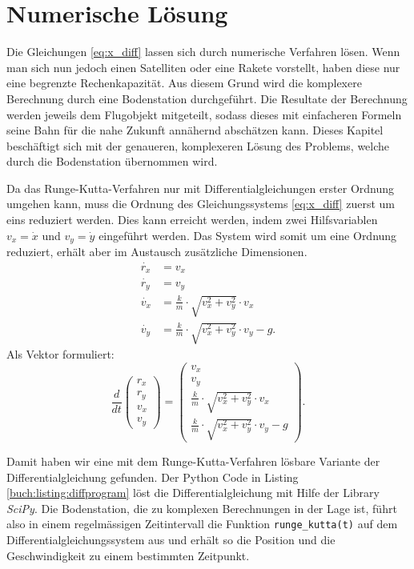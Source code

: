 \section{Numerische Lösung
\label{perturbation:section:nummerischeloesung}}
Die Gleichungen \eqref{eq:x_diff} lassen sich durch numerische Verfahren lösen.
Wenn man sich nun jedoch einen Satelliten oder eine Rakete vorstellt, haben diese nur eine begrenzte Rechenkapazität.
Aus diesem Grund wird die komplexere Berechnung durch eine Bodenstation durchgeführt.
Die Resultate der Berechnung werden jeweils dem Flugobjekt mitgeteilt, sodass dieses mit einfacheren Formeln seine Bahn für die nahe Zukunft annähernd abschätzen kann.
Dieses Kapitel beschäftigt sich mit der genaueren, komplexeren Lösung des Problems, welche durch die Bodenstation übernommen wird.

Da das Runge-Kutta-Verfahren nur mit Differentialgleichungen erster Ordnung umgehen kann, muss die Ordnung des Gleichungssystems \eqref{eq:x_diff}  zuerst um eins reduziert werden.
Dies kann erreicht werden, indem zwei Hilfsvariablen $v_x = \dot{x}$ und $v_y = \dot{y}$ eingeführt werden.
Das System wird somit um eine Ordnung reduziert, erhält aber im Austausch zusätzliche Dimensionen.
\begin{equation*}
\begin{aligned}
	\dot{r_x} &= v_x  \\
	\dot{r_y} &= v_y \\
	\dot{v_x} &= \frac{k}{m} \cdot \sqrt{v_x^2 + v_y^2} \cdot v_x \\
	\dot{v_y} &= \frac{k}{m} \cdot \sqrt{v_x^2 + v_y^2} \cdot v_y - g.
\end{aligned}
\end{equation*}
Als Vektor formuliert:
\[
\frac{d}{dt}\begin{pmatrix}r_x\\r_y\\v_x\\v_y\end{pmatrix} = \begin{pmatrix}v_x\\v_y\\\frac{k}{m} \cdot \sqrt{v_x^2 + v_y^2} \cdot v_x\\\frac{k}{m} \cdot \sqrt{v_x^2 + v_y^2} \cdot v_y - g\end{pmatrix}.
\]

Damit haben wir eine mit dem  Runge-Kutta-Verfahren lösbare Variante der Differentialgleichung gefunden.
Der Python Code in Listing \ref{buch:listing:diffprogram} löst die Differentialgleichung mit Hilfe der Library \textit{SciPy}.
Die Bodenstation, die zu komplexen Berechnungen in der Lage ist,
führt also in einem regelmässigen Zeitintervall die Funktion \lstinline[language=Python]{runge_kutta(t)}
auf dem Differentialgleichungssystem aus und erhält so die Position und die Geschwindigkeit zu einem bestimmten Zeitpunkt.




